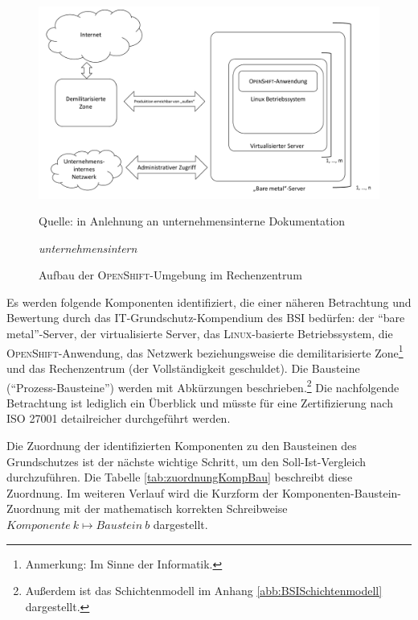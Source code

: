 \begin{figure}[h!]
	\centering
	\includegraphics[scale=0.45]{img/aufbauOpenShiftServerUmgebung.pdf}
	\caption{Aufbau der \textsc{OpenShift}-Umgebung im Rechenzentrum}
	\label{abb:aufbauServerUmgebung}
	{\footnotesize Quelle: in Anlehnung an unternehmensinterne Dokumentation\par}
	{\footnotesize \textit{unternehmensintern}}
\end{figure}

Es werden folgende Komponenten identifiziert, die einer näheren Betrachtung und Bewertung durch das IT-Grundschutz-Kompendium des \ac{BSI} bedürfen: der \enquote{bare metal}-Server, der virtualisierte Server, das \textsc{Linux}-basierte Betriebssystem, die \textsc{OpenShift}-Anwendung, das Netzwerk beziehungsweise die demilitarisierte Zone\footnote{Anmerkung: Im Sinne der Informatik.} und das Rechenzentrum (der Vollständigkeit geschuldet). Die Bausteine (\enquote{Prozess-Bausteine}) werden mit Abkürzungen beschrieben.\autocite[vgl.][S.\,2-4]{bundesamt_fur_sicherheit_in_der_informationstechnik_bsi_it-grundschutz-kompendium_2020}\footnote{Außerdem ist das Schichtenmodell im Anhang \vref{abb:BSISchichtenmodell} dargestellt.} Die nachfolgende Betrachtung ist lediglich ein Überblick und müsste für eine Zertifizierung nach ISO 27001 detailreicher durchgeführt werden.
\par
Die Zuordnung der identifizierten Komponenten zu den Bausteinen des Grundschutzes ist der nächste wichtige Schritt, um den Soll-Ist-Vergleich durchzuführen. Die Tabelle \vref{tab:zuordnungKompBau} beschreibt diese Zuordnung. Im weiteren Verlauf wird die Kurzform der Komponenten-Baustein-Zuordnung mit der mathematisch korrekten Schreibweise $ Komponente\ k \mapsto Baustein\ b $ dargestellt.
\par


